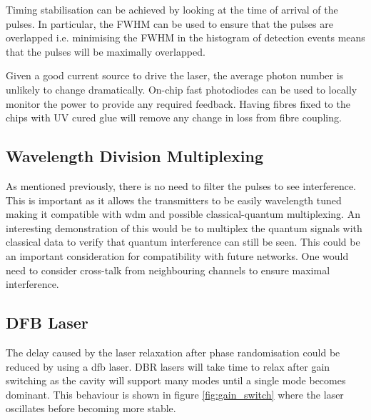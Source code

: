 Timing stabilisation can be achieved by looking at the time of arrival of the pulses. In particular, the \ac{FWHM} can be used to ensure that the pulses are overlapped i.e. minimising the \ac{FWHM} in the histogram of detection events means that the pulses will be maximally overlapped.

Given a good current source to drive the laser, the average photon number is unlikely to change dramatically. On-chip fast photodiodes can be used to locally monitor the power to provide any required feedback. Having fibres fixed to the chips with UV cured glue will remove any change in loss from fibre coupling.

%

\subsection{Wavelength Division Multiplexing}

As mentioned previously, there is no need to filter the pulses to see interference. This is important as it allows the transmitters to be easily wavelength tuned making it compatible with \ac{wdm} and possible classical-quantum multiplexing. An interesting demonstration of this would be to multiplex the quantum signals with classical data to verify that quantum interference can still be seen. This could be an important consideration for compatibility with future networks. One would need to consider cross-talk from neighbouring channels to ensure maximal interference.

\subsection{DFB Laser}

The delay caused by the laser relaxation after phase randomisation could be reduced by using a \ac{dfb} laser. \ac{DBR} lasers will take time to relax after gain switching as the cavity will support many modes until a single mode becomes dominant. This behaviour is shown in figure \ref{fig:gain_switch} where the laser oscillates before becoming more stable. 

